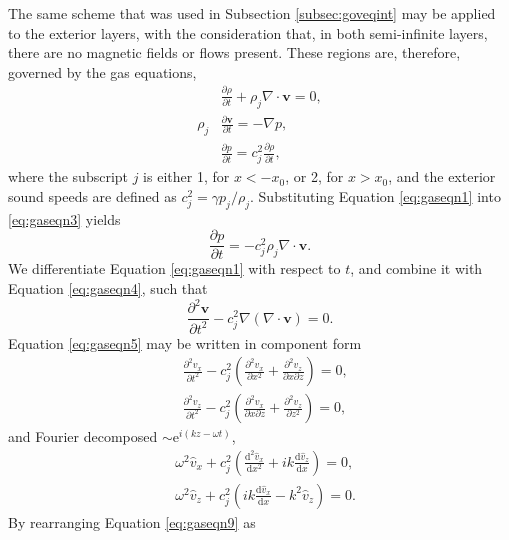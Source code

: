The same scheme that was used in Subsection \ref{subsec:goveqint} may be applied to the exterior layers, with the consideration that, in both semi-infinite layers, there are no magnetic fields or flows present.
These regions are, therefore, governed by the gas equations,
%
\begin{align}
\label{eq:gaseqn1}
& \frac{\partial \rho}{\partial t}
+ \rho_j \nabla \cdot \mathbf{v}
= 0,
\\[0.3cm]
\label{eq:gaseqn2}
\rho_j & \frac{\partial \mathbf{v}}{\partial t}
= - \nabla p,
\\[0.3cm]
\label{eq:gaseqn3}
& \frac{\partial p}{\partial t}
= c_j^2 \frac{\partial \rho}{\partial t},
\end{align}
%
where the subscript $j$ is either 1, for $x < - x_0$, or 2, for $x > x_0$, and the exterior sound speeds are defined as $c_j^2 = \gamma p_j/\rho_j$.
Substituting Equation \eqref{eq:gaseqn1} into \eqref{eq:gaseqn3} yields
%
\begin{equation}
\label{eq:gaseqn4}
\frac{\partial p}{\partial t} = - c_j^2 \rho_j \nabla \cdot \mathbf{v}.
\end{equation}
%
We differentiate Equation \eqref{eq:gaseqn1} with respect to $t$, and combine it with Equation \eqref{eq:gaseqn4}, such that
%
\begin{equation}
\label{eq:gaseqn5}
\frac{\partial^2 \mathbf{v}}{\partial t^2} - c_j^2 \nabla ( \nabla \cdot \mathbf{v} ) = 0.
\end{equation}
%
Equation \eqref{eq:gaseqn5} may be written in component form
%
\begin{align}
\label{eq:gaseqn6}
& \frac{\partial^2 v_x}{\partial t^2}
- c_j^2 \left( \frac{\partial^2 v_x}{\partial x^2}
+ \frac{\partial^2 v_z}{\partial x \partial z} \right)
= 0,
\\[0.3cm]
\label{eq:gaseqn7}
& \frac{\partial^2 v_z}{\partial t^2}
- c_j^2 \left( \frac{\partial^2 v_x}{\partial x \partial z}
+ \frac{\partial^2 v_z}{\partial z^2} \right)
= 0,
\end{align}
%
and Fourier decomposed $\sim \mathrm{e}^{i(k z - \omega t)}$,
%
\begin{align}
\label{eq:gaseqn8}
& \omega^2 \hat v_x
+ c_j^2 \left( \frac{\mathrm{d}^2 \hat v_x}{\mathrm{d} x^2}
+ i k \frac{\mathrm{d} \hat v_z}{\mathrm{d} x} \right)
= 0,
\\[0.3cm]
\label{eq:gaseqn9}
& \omega^2 \hat v_z
+ c_j^2 \left( i k \frac{\mathrm{d} \hat v_x}{\mathrm{d} x}
- k^2 \hat v_z \right)
= 0.
\end{align}
%
By rearranging Equation \eqref{eq:gaseqn9} as
